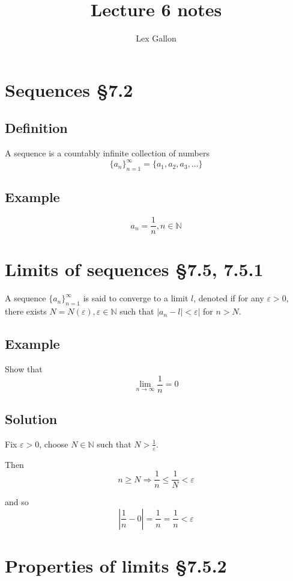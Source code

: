 \documentclass[11pt]{article}
\newcommand{\naturals}{\mathbb{N}}
\begin{document}
\title{Lecture 6 notes}
\author{Lex Gallon}
\maketitle

\tableofcontents

\section{Sequences §7.2}
\subsection*{Definition}
A sequence is a countably infinite collection of numbers
\[ \{a_n\}_{n=1}^\infty = \{ a_1, a_2, a_3, ...\} \]

\subsection*{Example}
\[ a_n = \frac{1}{n}, n\in \naturals \]

\section{Limits of sequences §7.5, 7.5.1}
A sequence $\{a_n\}_{n=1}^\infty$ is said to converge to a limit $l$, denoted
if for any $\varepsilon>0$, there exists $N=N(\varepsilon), \varepsilon\in \naturals$ such that $|a_n-l| < \varepsilon|$ for $n>N$.

\subsection*{Example}

Show that 
\[ \lim_{n\rightarrow\infty} \frac{1}{n} = 0 \]

\subsection*{Solution}

Fix $\varepsilon > 0$, choose $N \in \naturals$ such that $N>\frac{1}{\varepsilon}$.

Then
\[ n\geq N \Rightarrow \frac{1}{n} \leq \frac{1}{N} < \varepsilon \]

and so
\[ |\frac{1}{n} - 0| = \frac{1}{n} = \frac{1}{n} < \varepsilon \]

\section{Properties of limits §7.5.2}
\end{document}
